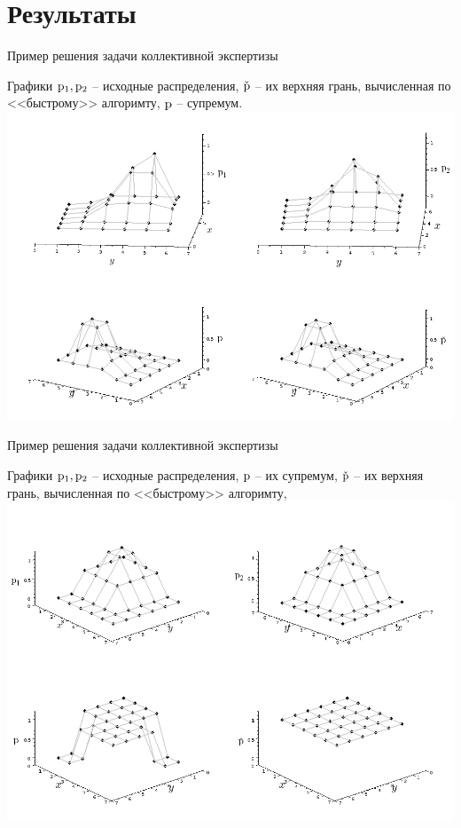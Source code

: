  
\section{Результаты}
\begin{frame}{Пример решения задачи  коллективной экспертизы}
  \vspace{-2ex}
  \begin{center}
    Графики ${\mathrm{p}}_1, {\mathrm{p}}_2$ -- исходные распределения, $\check{{\mathrm{p}}}$ -- их верхняя грань, вычисленная по <<быстрому>> алгоримту, ${\mathrm{p}}$ -- супремум. 
      \vspace{-1ex}
    \includegraphics[width=0.8\linewidth]{./pic/myplot_sovp}
  \end{center} 
\end{frame} %

\begin{frame}{Пример решения задачи  коллективной экспертизы}
  \vspace{-2ex}
  \begin{center}
    Графики ${\mathrm{p}}_1, {\mathrm{p}}_2$ -- исходные распределения, ${\mathrm{p}}$ -- их супремум, $\check{{\mathrm{p}}}$ -- их верхняя грань, вычисленная по <<быстрому>> алгоримту, 
      \vspace{-1ex}
    \includegraphics[width=0.8\linewidth]{./pic/mytest}
  \end{center} 
\end{frame} %

